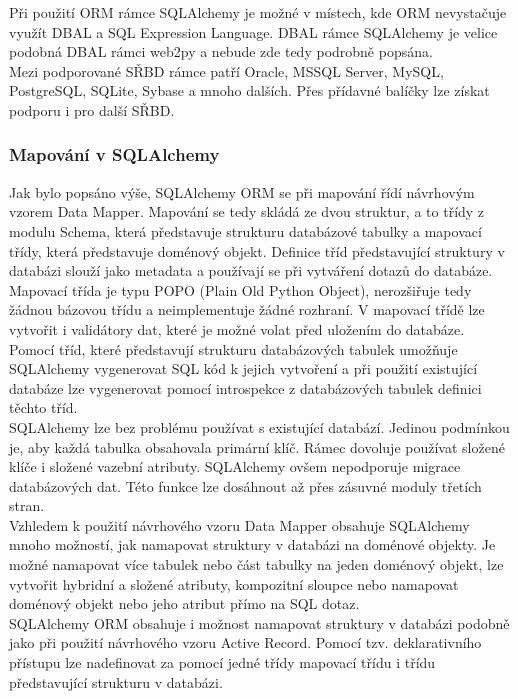 \documentclass[ing,male,java,dept456]{diploma}						%
\begin{document}
Při použití ORM rámce SQLAlchemy je možné v místech, kde ORM nevystačuje využít DBAL a SQL Expression Language. DBAL rámce SQLAlchemy je velice podobná DBAL rámci web2py a nebude zde tedy podrobně popsána. \\
Mezi podporované SŘBD rámce patří Oracle, MSSQL Server, MySQL, PostgreSQL, SQLite, Sybase a mnoho dalších. Přes přídavné balíčky lze získat podporu i pro další SŘBD.

\subsubsection{Mapování v SQLAlchemy}

Jak bylo popsáno výše, SQLAlchemy ORM se při mapování řídí návrhovým vzorem Data Mapper. Mapování se tedy skládá ze dvou struktur, a to třídy z modulu Schema, která představuje strukturu databázové tabulky a mapovací třídy, která představuje doménový objekt. Definice tříd představující struktury v databázi slouží jako metadata a používají se při vytváření dotazů do databáze. Mapovací třída je typu POPO (Plain Old Python Object), nerozšiřuje tedy žádnou bázovou třídu a neimplementuje žádné rozhraní. V mapovací třídě lze vytvořit i validátory dat, které je možné volat před uložením do databáze. \\
Pomocí tříd, které představují strukturu databázových tabulek umožňuje SQLAlchemy vygenerovat SQL kód k jejich vytvoření a při použití existující databáze lze vygenerovat pomocí introspekce z databázových tabulek definici těchto tříd. \\
SQLAlchemy lze bez problému používat s existující databází. Jedinou podmínkou je, aby každá tabulka obsahovala primární klíč. Rámec dovoluje používat složené klíče i složené vazební atributy. SQLAlchemy ovšem nepodporuje migrace databázových dat. Této funkce lze dosáhnout až přes zásuvné moduly třetích stran. \\
Vzhledem k použití návrhového vzoru Data Mapper obsahuje SQLAlchemy mnoho možností, jak namapovat struktury v databázi na doménové objekty. Je možné namapovat více tabulek nebo část tabulky na jeden doménový objekt, lze vytvořit hybridní a složené atributy, kompozitní sloupce nebo namapovat doménový objekt nebo jeho atribut přímo na SQL dotaz. \\
SQLAlchemy ORM obsahuje i možnost namapovat struktury v databázi podobně jako při použití návrhového vzoru Active Record. Pomocí tzv. deklarativního přístupu lze nadefinovat za pomocí jedné třídy mapovací třídu i třídu představující strukturu v databázi. 
\end{document}
